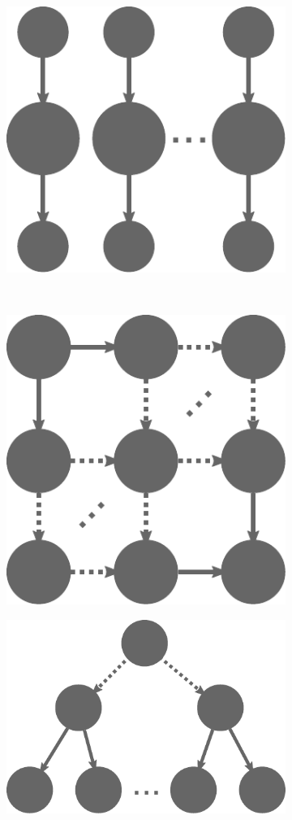 \begin{figure}
\begin{subfigure}{.2\textwidth}
		\includegraphics[width=.8\linewidth]{imgs/estee/shapes/triplets}
		\caption{}
		\label{fig:tg-triplets}
	\end{subfigure}
	\\
	\begin{subfigure}{.2\textwidth}
		\centering
		\includegraphics[width=.8\linewidth]{imgs/estee/shapes/grid}
		\caption{}
		\label{fig:tg-grid}
	\end{subfigure}
	\begin{subfigure}{.2\textwidth}
		\centering
		\includegraphics[width=.8\linewidth]{imgs/estee/shapes/splitters}

\end{subfigure}
\end{figure}
